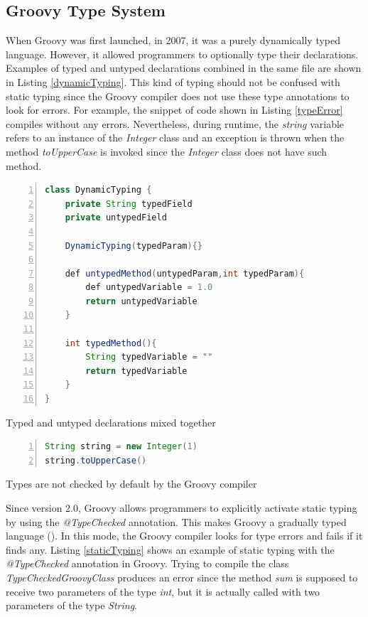 \documentclass[msc]{ppgccufmg}
\begin{document}
\subsection{Groovy Type System}

When Groovy was first launched, in 2007, it was a purely dynamically typed language.
However, it allowed programmers to optionally type their declarations.
Examples of typed and untyped declarations combined in the same file are shown in Listing \ref{dynamicTyping}.
This kind of typing should not be confused with static typing since the Groovy compiler does not use these type annotations to look for errors.
For example, the snippet of code shown in Listing \ref{typeError} compiles without any errors.
Nevertheless, during runtime, the \emph{string} variable refers to an instance of the \emph{Integer} class and an exception is thrown when the method \emph{toUpperCase} is invoked since the \emph{Integer} class does not have such method.

\begin{Listing}[ht]
\begin{lstlisting}[basicstyle=\ttfamily, language=Java,tabsize=2,breaklines=true,numbers=left,morekeywords={def}]
class DynamicTyping {
	private String typedField
	private untypedField

	DynamicTyping(typedParam){}

	def untypedMethod(untypedParam,int typedParam){
		def untypedVariable = 1.0
		return untypedVariable
	}

	int typedMethod(){
		String typedVariable = ""
		return typedVariable
	}
}
\end{lstlisting}
\caption{Typed and untyped declarations mixed together}
\label{dynamicTyping}
\end{Listing}

\begin{Listing}[ht]
\begin{lstlisting}[basicstyle=\ttfamily, language=Java,tabsize=2,breaklines=true,numbers=left]
String string = new Integer(1)
string.toUpperCase()
\end{lstlisting}
\caption{Types are not checked by default by the Groovy compiler}
\label{typeError}
\end{Listing}

Since version 2.0, Groovy allows programmers to explicitly activate static typing by using the \emph{@TypeChecked} annotation.
This makes Groovy a gradually typed language (\cite{gray05,gray08,gray11,siek07,takikawa12}).
In this mode, the Groovy compiler looks for type errors and fails if it finds any.
Listing \ref{staticTyping} shows an example of static typing with the \emph{@TypeChecked} annotation in Groovy.
Trying to compile the class \emph{TypeCheckedGroovyClass} produces an error since the method \emph{sum} is supposed to receive two parameters of the type \emph{int}, but it is actually called with two parameters of the type \emph{String}.
\end{document}
